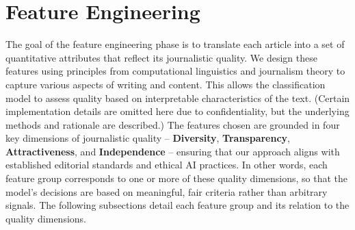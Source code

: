\newpage
\section{Feature Engineering}\label{sec:features_creating}

The goal of the feature engineering phase is to translate each article into a set of quantitative attributes that reflect its journalistic quality. We design these features using principles from computational linguistics and journalism theory to capture various aspects of writing and content. This allows the classification model to assess quality based on interpretable characteristics of the text. (Certain implementation details are omitted here due to confidentiality, but the underlying methods and rationale are described.) The features chosen are grounded in four key dimensions of journalistic quality – \textbf{Diversity}, \textbf{Transparency}, \textbf{Attractiveness}, and \textbf{Independence} – ensuring that our approach aligns with established editorial standards and ethical AI practices. In other words, each feature group corresponds to one or more of these quality dimensions, so that the model’s decisions are based on meaningful, fair criteria rather than arbitrary signals. The following subsections detail each feature group and its relation to the quality dimensions.

